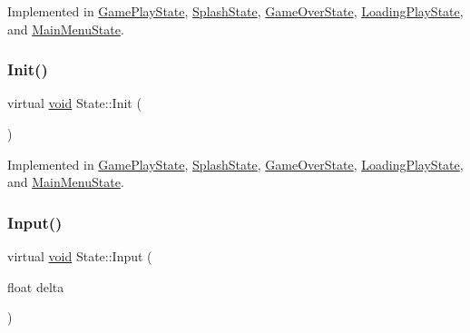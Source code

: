 Implemented in \hyperlink{classGamePlayState_a8a393249f2deabe0fe8f236b4e58cb17}{Game\+Play\+State}, \hyperlink{classSplashState_aca842c8e3ea2642980569ed3b4bb362a}{Splash\+State}, \hyperlink{classGameOverState_afb6fa68ff0c5e4f83725de8059c4f7c8}{Game\+Over\+State}, \hyperlink{classLoadingPlayState_a3735d8ecb6747de9ab62dddedf9eeaa3}{Loading\+Play\+State}, and \hyperlink{classMainMenuState_a52c4dad229a1e9851e8742b81bc30abb}{Main\+Menu\+State}.

\mbox{\label{classState_a7ab4d8c6aa239a17ed579d89a209b156}} 
\subsubsection{\texorpdfstring{Init()}{Init()}}
{\footnotesize\ttfamily virtual \hyperlink{imgui__impl__opengl3__loader_8h_ac668e7cffd9e2e9cfee428b9b2f34fa7}{void} State\+::\+Init (\begin{DoxyParamCaption}{ }\end{DoxyParamCaption})\hspace{0.3cm}{\ttfamily [pure virtual]}}



Implemented in \hyperlink{classGamePlayState_ae13389eea1f83f27d18ba200f107937d}{Game\+Play\+State}, \hyperlink{classSplashState_ae3e0604da087032c179593c237580988}{Splash\+State}, \hyperlink{classGameOverState_aa3d4f165ff735552f16132e929d369c2}{Game\+Over\+State}, \hyperlink{classLoadingPlayState_aaa131760db87f7dd206064105b53004c}{Loading\+Play\+State}, and \hyperlink{classMainMenuState_afab2a9b829a8ef752fed701d5cd260f8}{Main\+Menu\+State}.

\mbox{\label{classState_a1705412877f37a5cc8fc712542756076}} 
\subsubsection{\texorpdfstring{Input()}{Input()}}
{\footnotesize\ttfamily virtual \hyperlink{imgui__impl__opengl3__loader_8h_ac668e7cffd9e2e9cfee428b9b2f34fa7}{void} State\+::\+Input (\begin{DoxyParamCaption}\item[{float}]{delta }\end{DoxyParamCaption})\hspace{0.3cm}{\ttfamily [pure virtual]}}



